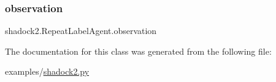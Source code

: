 \mbox{\label{classshadock2_1_1RepeatLabelAgent_af88efda5c17ebe03c85cc4b3446c1072}} 
\subsubsection{\texorpdfstring{observation}{observation}}
{\footnotesize\ttfamily shadock2.\+Repeat\+Label\+Agent.\+observation}



The documentation for this class was generated from the following file\+:\begin{DoxyCompactItemize}
\item 
examples/\hyperlink{shadock2_8py}{shadock2.\+py}\end{DoxyCompactItemize}
